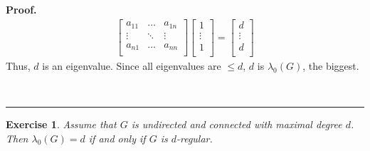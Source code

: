 \documentclass[12pt]{article}
\newtheorem{exercise}[theorem]{Exercise}
\newenvironment{proof}[1][Proof]{\textbf{#1.} }{\ \rule{0.5em}{0.5em}}
\begin{document}
\begin{proof}
\begin{align}
\begin{bmatrix}
            a_{11} & \ldots & a_{1n} \\
            \vdots & \ddots & \vdots \\
            a_{n1} & \ldots & a_{n n}\\
        \end{bmatrix} 
        \begin{bmatrix}
            1\\
            \vdots\\
            1\\
        \end{bmatrix} =
        \begin{bmatrix}
            d\\
            \vdots\\
            d\\
        \end{bmatrix} 
    \end{align}
    Thus, $d$ is an eigenvalue.
    Since all eigenvalues are $\leq d$,
    $d$ is $\lambda_0 (G)$, the biggest. 
    
\end{proof}


\begin{exercise}
Assume that $G$ is undirected and connected with maximal degree $d$. Then $%
\lambda_{0}(G)=d$ if and only if $G$ is $d$-regular.
\end{exercise}
\end{document}
